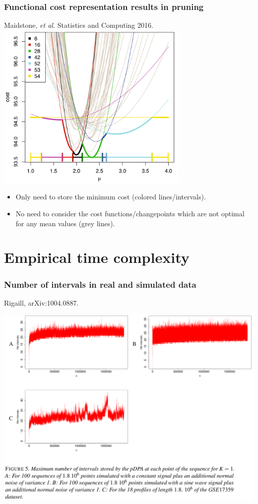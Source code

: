 \documentclass{beamer}
\begin{document}
\begin{frame}
  \frametitle{Functional cost representation results in pruning}
  
  Maidstone, {\it et al.} Statistics and Computing 2016.
\centering
\includegraphics[width=0.7\textwidth]{screenshot-Maidstone-figure-1}

\begin{itemize}
\item Only need to store the minimum cost (colored lines/intervals).
  \item No need to consider the cost functions/changepoints which are
    not optimal for any mean values (grey lines).
\end{itemize}
  
\end{frame}

\section{Empirical time complexity}

\begin{frame}
  \frametitle{Number of intervals in real and simulated data}
  Rigaill, arXiv:1004.0887.

  \includegraphics[width=\textwidth]{screenshot-figure-5}
\end{frame}
\end{document}
